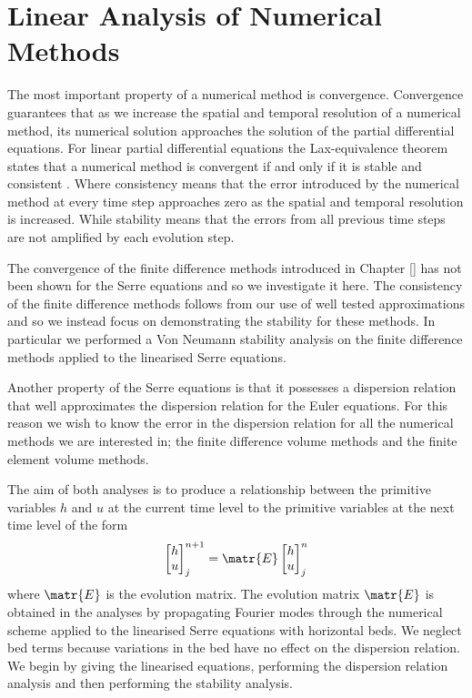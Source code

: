 
\chapter{Linear Analysis of Numerical Methods}
\label{chp:AnalNumMethod}
The most important property of a numerical method is convergence. Convergence guarantees that as we increase the spatial and temporal resolution of a numerical method, its numerical solution approaches the solution of the partial differential equations. For linear partial differential equations the Lax-equivalence theorem states that a numerical method is convergent if and only if it is stable and consistent \cite{Lax-Richtmyer-1956-267}. Where consistency means that the error introduced by the numerical method at every time step approaches zero as the spatial and temporal resolution is increased. While stability means that the errors from all previous time steps are not amplified by each evolution step.

The convergence of the finite difference methods introduced in Chapter [] has not been shown for the Serre equations and so we investigate it here. The consistency of the finite difference methods follows from our use of well tested approximations and so we instead focus on demonstrating the stability for these methods. In particular we performed a Von Neumann stability \cite{Charney-etal-1950-237} analysis on the finite difference methods applied to the linearised Serre equations.

Another property of the Serre equations is that it possesses a dispersion relation that well approximates the dispersion relation for the Euler equations. For this reason we wish to know the error in the dispersion relation for all the numerical methods we are interested in; the finite difference volume methods and the finite element volume methods. 

The aim of both analyses is to produce a relationship between the primitive variables $h$ and $u$ at the current time level to the primitive variables at the next time level of the form
\begin{equation}
\label{eqn:linearanalaim}
\begin{bmatrix}
h \\u
\end{bmatrix}^{n+1}_j = \matr{E} \begin{bmatrix}
h \\u
\end{bmatrix}^{n}_j
\end{equation}
where $\matr{E}$ is the evolution matrix. The evolution matrix $\matr{E}$ is obtained in the analyses by propagating Fourier modes through the numerical scheme applied to the linearised Serre equations with horizontal beds. We neglect bed terms because variations in the bed have no effect on the dispersion relation. We begin by giving the linearised equations, performing the dispersion relation analysis and then performing the stability analysis.
 
